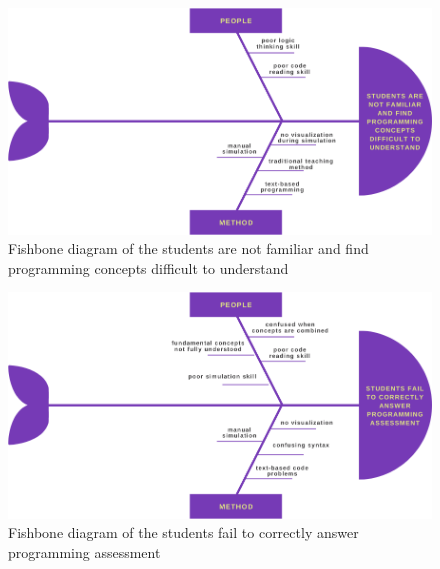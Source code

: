 \begin{doublespace}
\begin{center}
		\newpage
		\null\vfill
		\begin{figure}[H]
			\centering
			\includegraphics[width=0.8\textheight,angle=90]{figures/fishbone1.png}
			\caption[Ishikawa Diagram 1]{Fishbone diagram of the students are not familiar and find
			programming concepts difficult to understand}
			\label{fig:fishbone1}
		\end{figure}
		\vfill

		\newpage
		\null\vfill
		\begin{figure}[H]
			\centering
			\includegraphics[width=0.8\textheight,angle=90]{figures/fishbone2.png}
			\caption[Ishikawa Diagram 2]{Fishbone diagram of the students fail to correctly answer programming
			assessment}
			\label{fig:fishbone2}
		\end{figure}
		\vfill


\end{center}
\end{doublespace}
